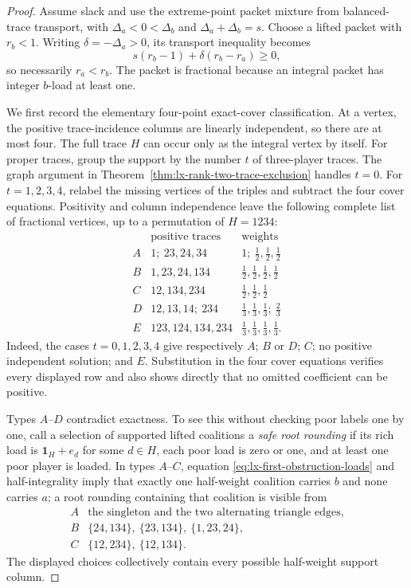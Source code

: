 \begin{proof}
Assume slack and use the extreme-point packet mixture from balanced-trace
transport, with
$\Delta_a<0<\Delta_b$ and $\Delta_a+\Delta_b=s$.  Choose a lifted packet with
$r_b<1$.  Writing $\delta=-\Delta_a>0$, its transport inequality becomes
\[
 s(r_b-1)+\delta(r_b-r_a)\geq0,                    \tag{FO-1}
 \label{eq:lx-first-obstruction-loads}
\]
so necessarily $r_a<r_b$.  The packet is fractional because an integral
packet has integer $b$-load at least one.

We first record the elementary four-point exact-cover classification.  At a
vertex, the positive trace-incidence columns are linearly independent, so
there are at most four.  The full trace $H$ can occur only as the integral
vertex by itself.  For proper traces, group the support by the number $t$ of
three-player traces.  The graph argument in
Theorem~\ref{thm:lx-rank-two-trace-exclusion} handles $t=0$.  For
$t=1,2,3,4$, relabel the missing vertices of the triples and subtract the four
cover equations.  Positivity and column independence leave the following
complete list of fractional vertices, up to a permutation of $H=1234$:
\[
\begin{array}{c|l|l}
 &\text{positive traces}&\text{weights}\\ \hline
 A&1;\ 23,24,34&1;\ \tfrac12,\tfrac12,\tfrac12\\
 B&1,23,24,134&\tfrac12,\tfrac12,\tfrac12,\tfrac12\\
 C&12,134,234&\tfrac12,\tfrac12,\tfrac12\\
 D&12,13,14;\ 234&\tfrac13,\tfrac13,\tfrac13;\ \tfrac23\\
 E&123,124,134,234&\tfrac13,\tfrac13,\tfrac13,\tfrac13.
\end{array}                                             \tag{FO-2}
\label{eq:lx-four-trace-vertices}
\]
Indeed, the cases $t=0,1,2,3,4$ give respectively $A$;
$B$ or $D$; $C$; no positive independent solution; and $E$.
Substitution in the four cover equations verifies every displayed row and
also shows directly that no omitted coefficient can be positive.

Types $A$--$D$ contradict exactness.  To see this without checking poor
labels one by one, call a selection of supported lifted coalitions a
\emph{safe root rounding} if its rich load is
$\mathbf1_H+e_d$ for some $d\in H$, each poor load is zero or one, and at
least one poor player is loaded.  In types $A$--$C$, equation
\eqref{eq:lx-first-obstruction-loads} and half-integrality imply that exactly
one half-weight coalition carries $b$ and none carries $a$; a root rounding
containing that coalition is visible from
\[
\begin{array}{c|l}
A&\text{the singleton and the two alternating triangle edges},\\
B&\{24,134\},\ \{23,134\},\ \{1,23,24\},\\
C&\{12,234\},\ \{12,134\}.
\end{array}                                             \tag{FO-3}
\]
The displayed choices collectively contain every possible half-weight
support column.


\end{proof}
